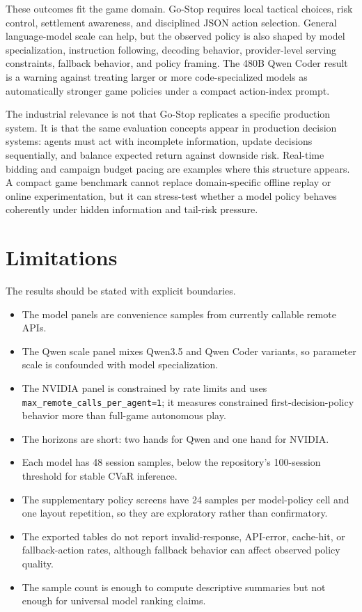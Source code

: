 \documentclass[11pt]{article}
\begin{document}
These outcomes fit the game domain. Go-Stop requires local tactical choices, risk control, settlement awareness, and disciplined JSON action selection. General language-model scale can help, but the observed policy is also shaped by model specialization, instruction following, decoding behavior, provider-level serving constraints, fallback behavior, and policy framing. The 480B Qwen Coder result is a warning against treating larger or more code-specialized models as automatically stronger game policies under a compact action-index prompt.

The industrial relevance is not that Go-Stop replicates a specific production system. It is that the same evaluation concepts appear in production decision systems: agents must act with incomplete information, update decisions sequentially, and balance expected return against downside risk. Real-time bidding and campaign budget pacing are examples where this structure appears. A compact game benchmark cannot replace domain-specific offline replay or online experimentation, but it can stress-test whether a model policy behaves coherently under hidden information and tail-risk pressure.

\section{Limitations}
The results should be stated with explicit boundaries.
\begin{itemize}
    \item The model panels are convenience samples from currently callable remote APIs.
    \item The Qwen scale panel mixes Qwen3.5 and Qwen Coder variants, so parameter scale is confounded with model specialization.
    \item The NVIDIA panel is constrained by rate limits and uses \texttt{max\_remote\_calls\_per\_agent=1}; it measures constrained first-decision-policy behavior more than full-game autonomous play.
    \item The horizons are short: two hands for Qwen and one hand for NVIDIA.
    \item Each model has 48 session samples, below the repository's 100-session threshold for stable CVaR inference.
    \item The supplementary policy screens have 24 samples per model-policy cell and one layout repetition, so they are exploratory rather than confirmatory.
    \item The exported tables do not report invalid-response, API-error, cache-hit, or fallback-action rates, although fallback behavior can affect observed policy quality.
    \item The sample count is enough to compute descriptive summaries but not enough for universal model ranking claims.
\end{itemize}
\end{document}
